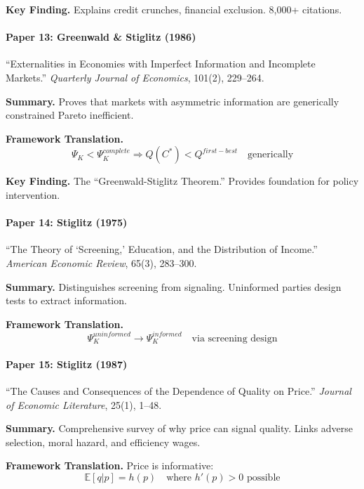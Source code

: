 \textbf{Key Finding.}
Explains credit crunches, financial exclusion. 8,000+ citations.

\paragraph{Paper 13: Greenwald \& Stiglitz (1986)}

``Externalities in Economies with Imperfect Information and Incomplete Markets.''
\textit{Quarterly Journal of Economics}, 101(2), 229--264.

\textbf{Summary.}
Proves that markets with asymmetric information are generically constrained 
Pareto inefficient.

\textbf{Framework Translation.}
\begin{equation}
\Psi_K < \Psi_K^{complete} \Rightarrow Q(C^*) < Q^{first-best} \quad \text{generically}
\end{equation}

\textbf{Key Finding.}
The ``Greenwald-Stiglitz Theorem.'' Provides foundation for policy intervention.

\paragraph{Paper 14: Stiglitz (1975)}

``The Theory of `Screening,' Education, and the Distribution of Income.''
\textit{American Economic Review}, 65(3), 283--300.

\textbf{Summary.}
Distinguishes screening from signaling. Uninformed parties design tests 
to extract information.

\textbf{Framework Translation.}
\begin{equation}
\Psi_K^{uninformed} \to \Psi_K^{informed} \quad \text{via screening design}
\end{equation}

\paragraph{Paper 15: Stiglitz (1987)}

``The Causes and Consequences of the Dependence of Quality on Price.''
\textit{Journal of Economic Literature}, 25(1), 1--48.

\textbf{Summary.}
Comprehensive survey of why price can signal quality. Links adverse selection, 
moral hazard, and efficiency wages.

\textbf{Framework Translation.}
Price is informative:
\begin{equation}
\mathbb{E}[q | p] = h(p) \quad \text{where } h'(p) > 0 \text{ possible}
\end{equation}

